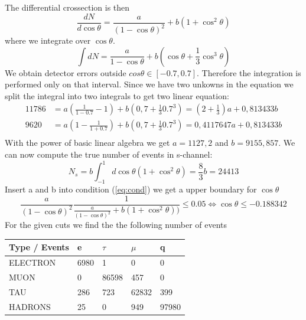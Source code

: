 \documentclass[]{article}
\begin{document}
The differential crossection is then
\begin{equation}
\frac{dN}{d\cos\theta} = \frac{a}{(1-\cos\theta)^2}+b(1+\cos^2\theta)
\end{equation}
where we integrate over $\cos\theta$.
\begin{equation}
\int dN = \frac{a}{1-\cos\theta} + b\left(\cos\theta+\frac{1}{3}\cos^3\theta\right)
\end{equation}
We obtain detector errors outside $cos\theta \in [-0.7,0.7]$. Therefore the integration is performed only on that interval. Since we have two unkowns in the equation we split the integral into two integrals to get two linear equation:
\begin{equation}
\begin{split}
11786 &= a(\frac{1}{1-0.7}-1)+b(0,7+\frac{1}{3}0.7^3) =  (2+\frac{1}{3})a+0,813433b\\
9620 &= a(1-\frac{1}{1+0.7})+b(0,7+\frac{1}{3}0.7^3) = 0,4117647a+ 0,813433b\\
\end{split}
\end{equation}
With the power of basic linear algebra we get $a=1127,2$ and $b=9155,857$.
We can now compute the true number of events in s-channel:
\begin{equation}
N_s = b\int_{-1}^1 d\cos\theta (1+\cos^2\theta) = \frac{8}{3}b = 24413
\end{equation}
Insert a and b into condition (\ref{eq:cond}) we get a upper boundary for $\cos\theta$
\begin{equation}
\frac{a}{(1-\cos\theta)^2}\frac{1}{\frac{a}{(1-\cos\theta)^2}+b(1+\cos^2\theta))} \leq 0.05 \iff \cos\theta \leq -0.188342
\end{equation}
For the given cuts we find the the following number of events
\newline
\newline
\begin{tabular}{ |p{3cm}||p{2cm}|p{2cm}|p{2cm}|p{2cm}|  }
 \hline
 Type / Events & e & $\tau$ & $\mu$ & q \\
 \hline
  ELECTRON & 6980 & 1 & 0 & 0 \\
  MUON & 0 & 86598 & 457 & 0 \\
  TAU & 286 & 723 & 62832 & 399 \\
  HADRONS & 25 & 0 & 949 & 97980 \\
 \hline
\end{tabular}
\newline
\newline
\end{document}
